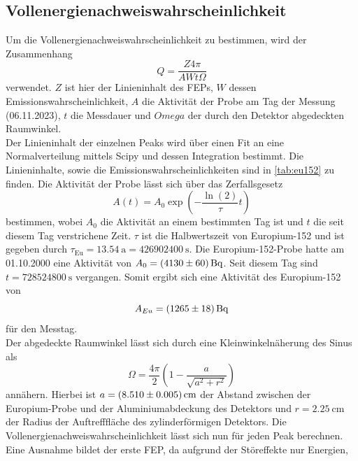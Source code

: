 \subsection{Vollenergienachweiswahrscheinlichkeit}

Um die Vollenergienachweiswahrscheinlichkeit zu bestimmen, wird der Zusammenhang
\begin{equation}
    \label{eqn:quality}
    Q = \frac{Z 4 \pi}{AWt \Omega}
\end{equation}
verwendet. $Z$ ist hier der Linieninhalt des FEPs, $W$ dessen Emissionswahrscheinlichkeit, $A$ die Aktivität der Probe am Tag der Messung (06.11.2023), $t$ die
Messdauer und $Omega$ der durch den Detektor abgedeckten Raumwinkel.\\
Der Linieninhalt der einzelnen Peaks wird über einen Fit an eine Normalverteilung mittels Scipy\cite{scipy} und dessen Integration bestimmt. Die Linieninhalte, sowie die Emissionswahrscheinlichkeiten sind in \autoref{tab:eu152} zu finden.
Die Aktivität der Probe lässt sich über das Zerfallsgesetz
\begin{equation}
    A(t) = A_0 \exp{(-\frac{\ln{(2)}}{\tau}t)}
\end{equation}
bestimmen, wobei $A_0$ die Aktivität an einem bestimmten Tag ist und $t$ die seit diesem Tag verstrichene Zeit. $\tau$ ist die Halbwertszeit von Europium-152 und ist gegeben 
durch $\tau_{\mathrm{Eu}} = \qty{13.54}{\mathrm{a}} = \qty{426902400}{\second}$\cite{Gammaspektrum_Eu152}. Die Europium-152-Probe hatte am 01.10.2000 eine Aktivität von $A_0 = \qty{4130 \pm 60}{\becquerel}$\cite{v18}. Seit 
diesem Tag sind $t=\qty{728524800}{\second}$ vergangen. Somit ergibt sich eine Aktivität des Europium-152 von 
\begin{equation}
    A_{Eu} = \qty{1265 \pm 18}{\becquerel}
\end{equation}
für den Messtag.\\
Der abgedeckte Raumwinkel lässt sich durch eine Kleinwinkelnäherung des Sinus als
\begin{equation}
    \Omega = \frac{4\pi}{2}(1-\frac{a}{\sqrt{a^2+r^2}})
\end{equation}
annähern. Hierbei ist $a = \qty{8.51 \pm 0.005}{\centi\metre}$ der Abstand zwischen der Europium-Probe und der Aluminiumabdeckung des Detektors und $r=\qty{2.25}{\centi\metre}$\cite{v18} der Radius
der Auftrefffläche des zylinderförmigen Detektors. Die Vollenergienachweiswahrscheinlichkeit lässt sich nun für jeden Peak berechnen. Eine Ausnahme bildet der erste FEP, da aufgrund der Störeffekte nur Energien,
